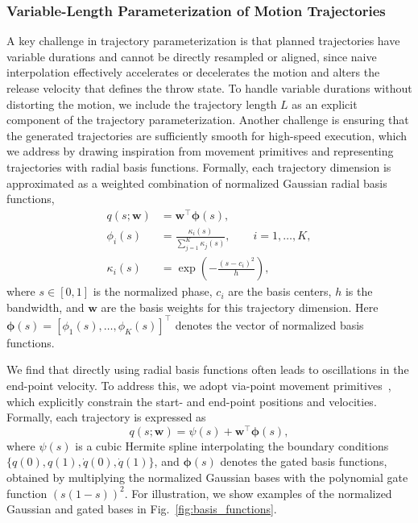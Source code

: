 \documentclass[letterpaper, 10 pt, conference]{ieeeconf}  %
\begin{document}
\subsubsection{Variable-Length Parameterization of Motion Trajectories}
A key challenge in trajectory parameterization is that planned trajectories have variable durations and cannot be directly resampled or aligned,
since naive interpolation effectively accelerates or decelerates the motion and alters the release velocity that defines the throw state.
To handle variable durations without distorting the motion,
we include the trajectory length $L$ as an explicit component of the trajectory parameterization.
Another challenge is ensuring that the generated trajectories are sufficiently smooth for high-speed execution,
which we address by drawing inspiration from movement primitives and representing trajectories with radial basis functions.
Formally, each trajectory dimension is approximated as a weighted combination of normalized Gaussian radial basis functions,
\begin{equation}
\label{eq:rbf-mp}
\begin{aligned}
q(s;\mathbf{w}) &= \mathbf{w}^\top \boldsymbol{\phi}(s), \\
\phi_i(s) &= \frac{\kappa_i(s)}{\sum_{j=1}^{K} \kappa_j(s)}, \qquad i=1,\dots,K, \\
\kappa_i(s) &= \exp\!\left(-\frac{(s - c_i)^2}{h}\right),
\end{aligned}
\end{equation}
where $s \in [0,1]$ is the normalized phase, $c_i$ are the basis centers, $h$ is the bandwidth, and $\mathbf{w}$ are the basis weights for this trajectory dimension.
Here $\boldsymbol{\phi}(s) = [\phi_1(s), \dots, \phi_K(s)]^\top$ denotes the vector of normalized basis functions.

We find that directly using radial basis functions often leads to oscillations in the end-point velocity.
To address this, we adopt via-point movement primitives~\cite{zhou2019vmp}, which explicitly constrain the start- and end-point positions and velocities.
Formally, each trajectory is expressed as
\begin{equation}
    q(s;\mathbf{w}) = \psi(s) + \mathbf{w}^\top \boldsymbol{\phi}(s),
\end{equation}
where $\psi(s)$ is a cubic Hermite spline interpolating the boundary conditions 
$\{q(0), q(1), \dot q(0), \dot q(1)\}$,
and $\boldsymbol{\phi}(s)$ denotes the gated basis functions, obtained by multiplying the normalized Gaussian bases with the polynomial gate function $(s(1-s))^2$. For illustration, we show examples of the normalized Gaussian and gated bases in Fig.~\ref{fig:basis_functions}.
\end{document}
